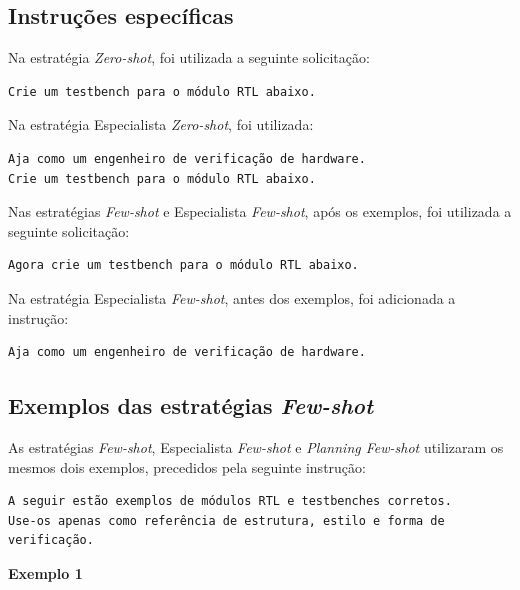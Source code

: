 \subsection{Instruções específicas}

Na estratégia \textit{Zero-shot}, foi utilizada a seguinte solicitação:

\begingroup
\footnotesize
\begin{verbatim}
Crie um testbench para o módulo RTL abaixo.
\end{verbatim}
\endgroup

Na estratégia Especialista \textit{Zero-shot}, foi utilizada:

\begingroup
\footnotesize
\begin{verbatim}
Aja como um engenheiro de verificação de hardware.
Crie um testbench para o módulo RTL abaixo.
\end{verbatim}
\endgroup

Nas estratégias \textit{Few-shot} e Especialista \textit{Few-shot}, após os exemplos, foi utilizada a seguinte solicitação:

\begingroup
\footnotesize
\begin{verbatim}
Agora crie um testbench para o módulo RTL abaixo.
\end{verbatim}
\endgroup

Na estratégia Especialista \textit{Few-shot}, antes dos exemplos, foi adicionada a instrução:

\begingroup
\footnotesize
\begin{verbatim}
Aja como um engenheiro de verificação de hardware.
\end{verbatim}
\endgroup


\subsection{Exemplos das estratégias \textit{Few-shot}}

As estratégias \textit{Few-shot}, Especialista \textit{Few-shot} e \textit{Planning Few-shot} utilizaram os mesmos dois exemplos, precedidos pela seguinte instrução:

\begingroup
\footnotesize
\begin{verbatim}
A seguir estão exemplos de módulos RTL e testbenches corretos.
Use-os apenas como referência de estrutura, estilo e forma de
verificação.
\end{verbatim}
\endgroup

\noindent\textbf{Exemplo 1}

